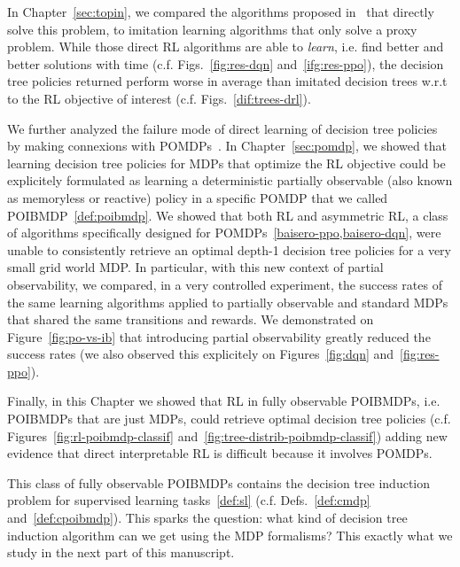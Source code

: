 In Chapter~\ref{sec:topin}, we compared the algorithms proposed in~\cite{topin2021iterative} that directly solve this problem, to imitation learning algorithms that only solve a proxy problem.
While those direct RL algorithms are able to \textit{learn}, i.e. find better and better solutions with time (c.f. Figs.~\ref{fig:res-dqn} and~\ref{ifg:res-ppo}), the decision tree policies returned perform worse in average than imitated decision trees w.r.t to the RL objective of interest (c.f. Figs.~\ref{dif:trees-drl}).

We further analyzed the failure mode of direct learning of decision tree policies by making connexions with POMDPs~\cite{POMDP,chap2}.
In Chapter~\ref{sec:pomdp}, we showed that learning decision tree policies for MDPs that optimize the RL objective could be explicitely formulated as learning a deterministic partially observable (also known as memoryless or reactive) policy in a specific POMDP that we called POIBMDP~\ref{def:poibmdp}.
We showed that both RL and asymmetric RL, a class of algorithms specifically designed for POMDPs~\ref{baisero-ppo,baisero-dqn}, were unable to consistently retrieve an optimal depth-1 decision tree policies for a very small grid world MDP.
In particular, with this new context of partial observability, we compared, in a very controlled experiment, the success rates of the same learning algorithms applied to partially observable and standard MDPs that shared the same transitions and rewards.
We demonstrated on Figure~\ref{fig:po-vs-ib} that introducing partial observability greatly reduced the success rates (we also observed this explicitely on Figures~\ref{fig:dqn} and~\ref{fig:res-ppo}).  

Finally, in this Chapter we showed that RL in fully observable POIBMDPs, i.e. POIBMDPs that are just MDPs, could retrieve optimal decision tree policies (c.f. Figures~\ref{fig:rl-poibmdp-classif} and~\ref{fig:tree-distrib-poibmdp-classif}) adding new evidence that direct interpretable RL is difficult because it involves POMDPs.

This class of fully observable POIBMDPs contains the decision tree induction problem for supervised learning tasks~\ref{def:sl} (c.f. Defs.~\ref{def:cmdp} and~\ref{def:cpoibmdp}).
This sparks the question: what kind of decision tree induction algorithm can we get using the MDP formalisms?
This exactly what we study in the next part of this manuscript.

